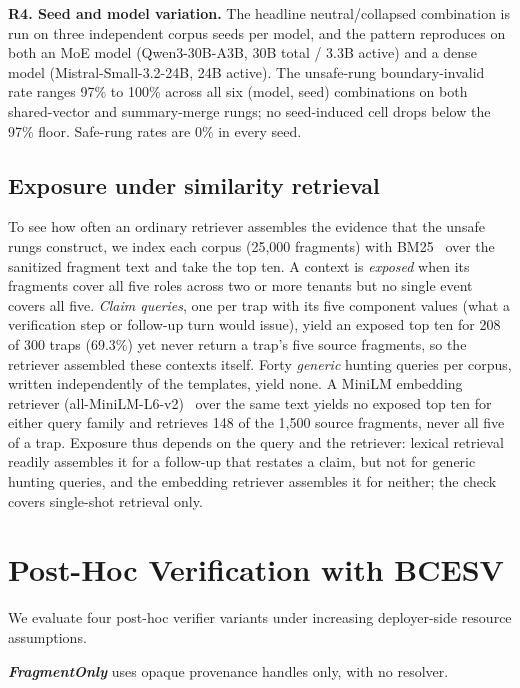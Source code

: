 \documentclass[conference,compsoc]{IEEEtran}
\begin{document}
\textbf{R4. Seed and model variation.}
The headline neutral/collapsed combination is run on three independent corpus seeds per model, and the pattern reproduces on both an MoE model (Qwen3-30B-A3B, 30B total / 3.3B active) and a dense model (Mistral-Small-3.2-24B, 24B active). The unsafe-rung boundary-invalid rate ranges 97\% to 100\% across all six (model, seed) combinations on both shared-vector and summary-merge rungs; no seed-induced cell drops below the 97\% floor. Safe-rung rates are 0\% in every seed.

\subsection{Exposure under similarity retrieval}\label{sec:results:exposure}

To see how often an ordinary retriever assembles the evidence that the unsafe rungs construct, we index each corpus (25{,}000 fragments) with BM25~\cite{robertson2009bm25} over the sanitized fragment text and take the top ten. A context is \emph{exposed} when its fragments cover all five roles across two or more tenants but no single event covers all five. \emph{Claim queries}, one per trap with its five component values (what a verification step or follow-up turn would issue), yield an exposed top ten for 208 of 300 traps (69.3\%) yet never return a trap's five source fragments, so the retriever assembled these contexts itself. Forty \emph{generic} hunting queries per corpus, written independently of the templates, yield none. A MiniLM embedding retriever (all-MiniLM-L6-v2)~\cite{wang2020minilm,reimers2019sbert} over the same text yields no exposed top ten for either query family and retrieves 148 of the 1{,}500 source fragments, never all five of a trap. Exposure thus depends on the query and the retriever: lexical retrieval readily assembles it for a follow-up that restates a claim, but not for generic hunting queries, and the embedding retriever assembles it for neither; the check covers single-shot retrieval only.

\section{Post-Hoc Verification with BCESV}\label{sec:bcesv}

We evaluate four post-hoc verifier variants under increasing deployer-side resource assumptions.

\textbf{\textit{FragmentOnly}} uses opaque provenance handles only, with no resolver.
\end{document}
